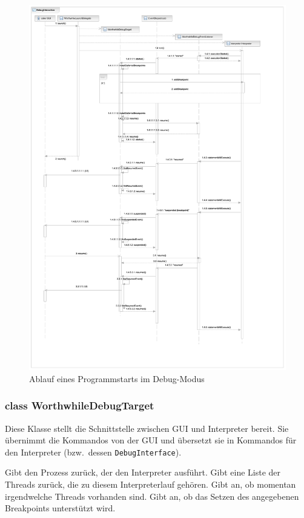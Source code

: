 \begin{figure}
	\caption{Ablauf eines Programmstarts im Debug-Modus}
	\hspace{-18mm}%
	\includegraphics[height=\textheight]{diagrams/debug_sequence.pdf}
\end{figure}

\subsubsection{class WorthwhileDebugTarget}

Diese Klasse stellt die Schnittstelle zwischen GUI und Interpreter bereit. Sie übernimmt die Kommandos von der GUI und übersetzt sie in Kommandos für den Interpreter (bzw.\ dessen \texttt{DebugInterface}).

\begin{description}
	 Gibt den Prozess zurück, der den Interpreter ausführt.
	 Gibt eine Liste der Threads zurück, die zu diesem Interpreterlauf gehören.
	 Gibt an, ob momentan irgendwelche Threads vorhanden sind.
	 Gibt an, ob das Setzen des angegebenen Breakpoints unterstützt wird.
\end{description}

